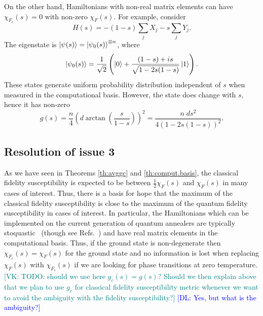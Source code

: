 \documentclass[american,aps,pra,reprint,floatfix,nofootinbib,superscriptaddress]{revtex4-2}
\newcommand{\VK}[1]{\textcolor{teal}{[VK: #1]}}
\newcommand{\DL}[1]{\textcolor{blue}{[DL: #1]}}
\begin{document}
On the other hand, Hamiltonians with non-real matrix elements
can have $\chi_{F_c}(s) = 0$ with non-zero $\chi_F(s)$. For example,
consider
\begin{equation}
  H(s) = - (1-s) \sum_j X_j - s \sum_j Y_j.
\end{equation}
The eigenstate is $\ket{\psi(s)} = \ket{\psi_0(s)}^{\otimes n}$, where
\begin{equation}
  \ket{\psi_0(s)} = \frac1{\sqrt2} \left(
    \ket{0} + \frac{(1-s) + is}{\sqrt{1-2s(1-s)}}\ket{1}\right).
\end{equation}
These states generate uniform probability distribution independent of $s$
when measured in the computational basis. However, the state does change
with $s$, hence it has non-zero
\begin{equation}
  g(s) = \frac{n}{4} \left(d \arctan\left(\frac{s}{1-s}\right)\right)^2 =
  \frac{n\;ds^2}{4(1-2s(1-s))^2}.
\end{equation}

\subsection{Resolution of issue 3}
\label{ss:resolution-issue-3}
As we have seen in Theorems \ref{th:avggc} and \ref{th:comput.basis}, the
classical fidelity susceptibility is expected to be between $\frac12 \chi_F(s)$
and $\chi_F(s)$ in many cases of interest. Thus, there is a basis for hope that the
maximum of the classical fidelity susceptibility is close to the maximum
of the quantum fidelity susceptibility in cases of interest. In particular, the
Hamiltonians which can be implemented on the current generation of quantum annealers are typically
stoquastic~\cite{Bravyi:QIC08} (though see Refs.~\cite{Vinci:2017aa,Ozfidan:2020aa,halverson2020efficient}) and have real matrix elements in the computational
basis. Thus, if the ground state is non-degenerate then $\chi_{F_c}(s) = \chi_F(s)$
for the ground state and no information is lost when replacing $\chi_F(s)$ with
$\chi_{F_c}(s)$ if we are looking for phase transitions at zero temperature.
\VK{TODO: should we use here $g_c(s) = g(s)$? Should we then explain above
that we plan to use $g_c$ for classical fidelity susceptibility metric
whenever we want to avoid the ambiguity with the fidelity susceptibility?} \DL{Yes, but what is the ambiguity?}
\end{document}
